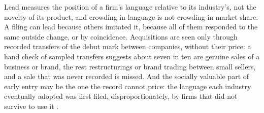 Lead measures the position of a firm's language relative to its
industry's, not the novelty of its product, and crowding in language is
not crowding in market share. A filing can lead because others imitated
it, because all of them responded to the same outside change, or by
coincidence. Acquisitions are seen only through recorded transfers of
the debut mark between companies, without their price: a hand check of
sampled transfers suggests about seven in ten are genuine sales of a
business or brand, the rest restructurings or brand trading between
small sellers, and a sale that was never recorded is missed. And the
socially valuable part of early entry may be the
one the record cannot price: the language each industry eventually
adopted was first filed, disproportionately, by firms that did not
survive to use it \citep{KerrNanda2014}.



